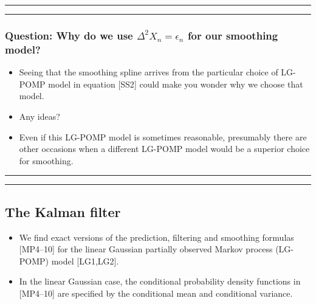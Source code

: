\documentclass[]{article}
\begin{document}
\begin{center}\rule{0.5\linewidth}{\linethickness}\end{center}

\begin{center}\rule{0.5\linewidth}{\linethickness}\end{center}

\subsubsection{\texorpdfstring{Question: Why do we use
\(\Delta^2 X_n=\epsilon_n\) for our smoothing
model?}{Question: Why do we use \textbackslash{}Delta\^{}2 X\_n=\textbackslash{}epsilon\_n for our smoothing model?}}\label{question-why-do-we-use-delta2-x_nepsilon_n-for-our-smoothing-model}

\begin{itemize}
\item
  Seeing that the smoothing spline arrives from the particular choice of
  LG-POMP model in equation {[}SS2{]} could make you wonder why we
  choose that model.
\item
  Any ideas?
\item
  Even if this LG-POMP model is sometimes reasonable, presumably there
  are other occasions when a different LG-POMP model would be a superior
  choice for smoothing.
\end{itemize}

\begin{center}\rule{0.5\linewidth}{\linethickness}\end{center}

\begin{center}\rule{0.5\linewidth}{\linethickness}\end{center}

\subsection{The Kalman filter}\label{the-kalman-filter}

\begin{itemize}
\item
  We find exact versions of the prediction, filtering and smoothing
  formulas {[}MP4--10{]} for the linear Gaussian partially observed
  Markov process (LG-POMP) model {[}LG1,LG2{]}.
\item
  In the linear Gaussian case, the conditional probability density
  functions in {[}MP4--10{]} are specified by the conditional mean and
  conditional variance.
\end{itemize}
\end{document}
